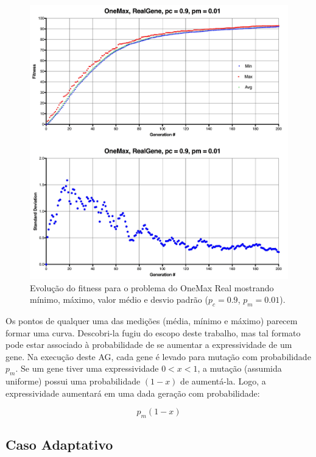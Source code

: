 \begin{figure}[ht!]
    \centering \includegraphics[width=1.0\textwidth]{onemax_real.jpg}
    \caption{Evolução do fitness para o problema do OneMax Real mostrando mínimo, máximo, valor médio  e desvio padrão ($p_c=0.9$, $p_m=0.01$).}
    \label{fig:onemax_real}
\end{figure}

Os pontos de qualquer uma das medições (média, mínimo e máximo) parecem formar uma curva. Descobri-la fugiu do escopo deste trabalho, mas tal formato pode estar associado à probabilidade de se aumentar a expressividade de um gene. Na execução deste AG, cada gene é levado para mutação com probabilidade $p_m$. Se um gene tiver uma expressividade $0 < x < 1$, a mutação (assumida uniforme) possui uma probabilidade $(1-x)$ de aumentá-la. Logo, a expressividade aumentará em uma dada geração com probabilidade:

\begin{equation}
	p_m(1-x)
\end{equation}

\subsection{Caso Adaptativo}

